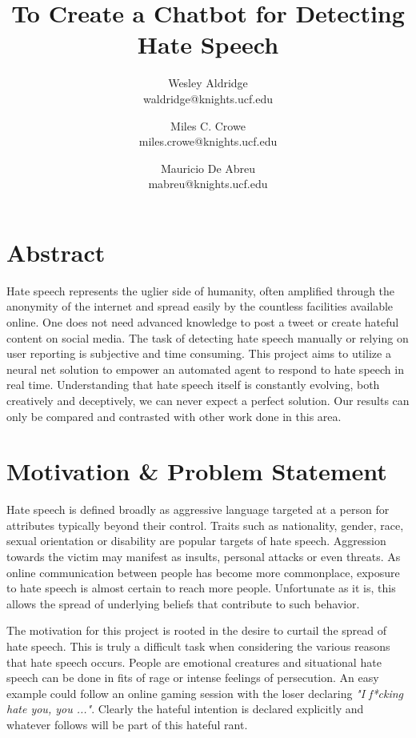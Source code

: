 \documentclass[conference]{sig-alternate-05-2015}
\begin{document}
\title{To Create a Chatbot for Detecting Hate Speech}

\author{Wesley Aldridge\\ waldridge@knights.ucf.edu \and Miles C. Crowe  \\ miles.crowe@knights.ucf.edu \and Mauricio De Abreu\\ mabreu@knights.ucf.edu}

\maketitle

\section{Abstract}
Hate speech represents the uglier side of humanity, often amplified through the anonymity of the internet and spread easily by the countless facilities available online.  One does not need advanced knowledge to post a tweet or create hateful content on social media.  The task of detecting hate speech manually or relying on user reporting is subjective and time consuming.  This project aims to utilize a neural net solution to empower an automated agent to respond to hate speech in real time.  Understanding that hate speech itself is constantly evolving, both creatively and deceptively, we can never expect a perfect solution.  Our results can only be compared and contrasted with other work done in this area.

\section{Motivation \& Problem Statement}\label{sec:motivation}
Hate speech is defined broadly as aggressive language targeted at a person for attributes typically beyond their control.  Traits such as nationality, gender, race, sexual orientation or disability are popular targets of hate speech\cite{Dictionary.com}.  Aggression towards the victim may manifest as insults, personal attacks or even threats.  As online communication between people has become more commonplace, exposure to hate speech is almost certain to reach more people.  Unfortunate as it is, this allows the spread of underlying beliefs that contribute to such behavior.

The motivation for this project is rooted in the desire to curtail the spread of hate speech.  This is truly a difficult task when considering the various reasons that hate speech occurs.  People are emotional creatures and situational hate speech can be done in fits of rage or intense feelings of persecution.  An easy example could follow an online gaming session with the loser declaring \textit{"I f*cking hate you, you ..."}.  Clearly the hateful intention is declared explicitly and whatever follows will be part of this hateful rant.  
\end{document}
